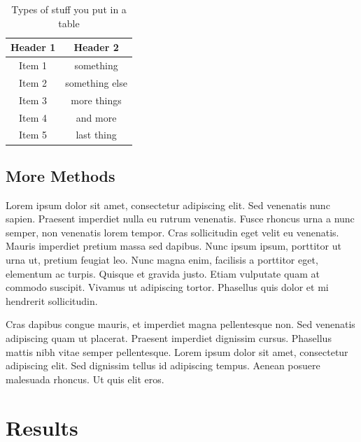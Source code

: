 \documentclass[double,12pt]{beavtex}
\begin{document}
\begin{table}[ht]
\caption{Types of stuff you put in a table} %
\centering  %
\begin{tabular}{c c} %
\hline\hline                        %
Header 1 & Header 2 \\ [0.5ex] %
\hline                  %
Item 1 & something  \\ %
Item 2 & something else  \\
Item 3 & more things  \\
Item 4 & and more \\
Item 5 & last thing \\ [1ex]      %
\hline %
\end{tabular}
\label{table:misc} %
\end{table}



\section{More Methods}

Lorem ipsum dolor sit amet, consectetur adipiscing elit. Sed venenatis nunc sapien. Praesent imperdiet nulla eu rutrum venenatis. Fusce rhoncus urna a nunc semper, non venenatis lorem tempor. Cras sollicitudin eget velit eu venenatis. Mauris imperdiet pretium massa sed dapibus. Nunc ipsum ipsum, porttitor ut urna ut, pretium feugiat leo. Nunc magna enim, facilisis a porttitor eget, elementum ac turpis. Quisque et gravida justo. Etiam vulputate quam at commodo suscipit. Vivamus ut adipiscing tortor. Phasellus quis dolor et mi hendrerit sollicitudin. 

Cras dapibus congue mauris, et imperdiet magna pellentesque non. Sed venenatis adipiscing quam ut placerat. Praesent imperdiet dignissim cursus. Phasellus mattis nibh vitae semper pellentesque. Lorem ipsum dolor sit amet, consectetur adipiscing elit. Sed dignissim tellus id adipiscing tempus. Aenean posuere malesuada rhoncus. Ut quis elit eros.



\chapter{Results}
\end{document}

